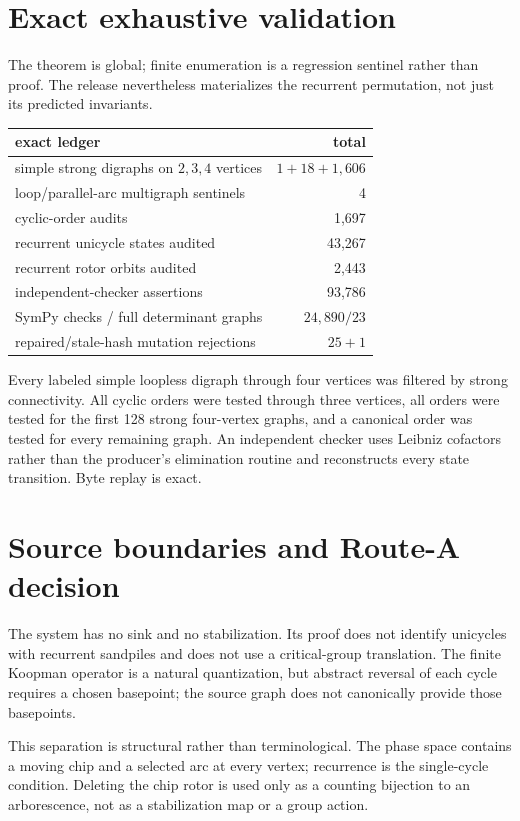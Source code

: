 \documentclass[10pt]{article}
\begin{document}
\section{Exact exhaustive validation}
The theorem is global; finite enumeration is a regression sentinel rather
than proof.  The release nevertheless materializes the recurrent permutation,
not just its predicted invariants.
\begin{center}
\small
\begin{tabular}{@{}lr@{}}
\toprule
exact ledger & total\\
\midrule
simple strong digraphs on $2,3,4$ vertices & $1+18+1{,}606$\\
loop/parallel-arc multigraph sentinels & 4\\
cyclic-order audits & 1,697\\
recurrent unicycle states audited & 43,267\\
recurrent rotor orbits audited & 2,443\\
independent-checker assertions & 93,786\\
SymPy checks / full determinant graphs & $24{,}890/23$\\
repaired/stale-hash mutation rejections & $25+1$\\
\bottomrule
\end{tabular}
\end{center}
Every labeled simple loopless digraph through four vertices was filtered by
strong connectivity.  All cyclic orders were tested through three vertices,
all orders were tested for the first 128 strong four-vertex graphs, and a
canonical order was tested for every remaining graph.  An independent checker
uses Leibniz cofactors rather than the producer's elimination routine and
reconstructs every state transition.  Byte replay is exact.

\section{Source boundaries and Route-A decision}
The system has no sink and no stabilization.  Its proof does not identify
unicycles with recurrent sandpiles and does not use a critical-group
translation.  The finite Koopman operator is a natural quantization, but
abstract reversal of each cycle requires a chosen basepoint; the source graph
does not canonically provide those basepoints.

This separation is structural rather than terminological.  The phase space
contains a moving chip and a selected arc at every vertex; recurrence is the
single-cycle condition.  Deleting the chip rotor is used only as a counting
bijection to an arborescence, not as a stabilization map or a group action.
\end{document}

